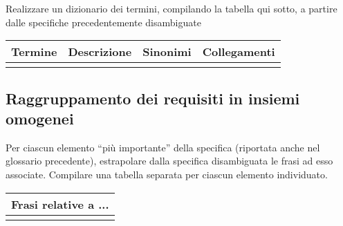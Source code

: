 \begin{templateblock}
    Realizzare un dizionario dei termini, compilando la tabella qui sotto,
    a partire dalle specifiche precedentemente disambiguate
\end{templateblock}

\begin{tabularx}{\linewidth}{|Y|Y|Y|Y|}
    \hline
    \textbf{Termine} & \textbf{Descrizione} & \textbf{Sinonimi} & \textbf{Collegamenti} \\\hline
                     &                      &                   &                       \\ \hline
\end{tabularx}

\subsection*{Raggruppamento dei requisiti in insiemi omogenei}

\begin{templateblock}
    Per ciascun elemento “più importante” della specifica
    (riportata anche nel glossario precedente), estrapolare dalla specifica
    disambiguata le frasi ad esso associate.
    Compilare una tabella separata per ciascun elemento individuato.
\end{templateblock}

\begin{tabularx}{\linewidth}{|X|}
    \hline
    \rowcolor{tgray}
    \textbf{Frasi relative a ...} \\\hline
    \\ \hline
\end{tabularx}
